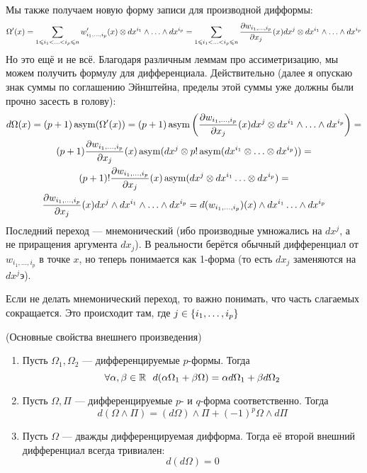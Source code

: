 \begin{note}
	Мы также получаем новую форму записи для производной дифформы:
	\[
		\Omega'(x) = \sum_{1 \leqslant i_1 < \ldots < i_p \leqslant n} w'_{i_1, \ldots, i_p}(x) \otimes dx^{i_1} \wedge \ldots \wedge dx^{i_p} = \sum_{1 \leqslant i_1 < \ldots < i_p \leqslant n} \frac{\partial w_{i_1, \ldots, i_p}}{\partial x_j}(x) dx^j \otimes dx^{i_1} \wedge \ldots \wedge dx^{i_p}
	\]
	Но это ещё и не всё. Благодаря различным леммам про ассиметризацию, мы можем получить формулу для дифференциала. Действительно (далее я опускаю знак суммы по соглашению Эйнштейна, пределы этой суммы уже должны были прочно засесть в голову):
	\begin{multline*}
		d\Omega(x) = (p + 1)\operatorname{asym}(\Omega'(x)) = (p + 1) \operatorname{asym}\left(\frac{\partial w_{i_1, \ldots, i_p}}{\partial x_j}(x)dx^j \otimes dx^{i_1} \wedge \ldots \wedge dx^{i_p}\right) =
		\\
		(p + 1) \frac{\partial w_{i_1, \ldots, i_p}}{\partial x_j}(x) \operatorname{asym}(dx^j \otimes p!\operatorname{asym}(dx^{i_1} \otimes \ldots \otimes dx^{i_p})) =
		\\
		(p + 1)! \frac{\partial w_{i_1, \ldots, i_p}}{\partial x_j}(x) \operatorname{asym}(dx^{j} \otimes dx^{i_1} \ldots \otimes dx^{i_p}) =
		\\
		\frac{\partial w_{i_1, \ldots, i_p}}{\partial x_j}(x) dx^j \wedge dx^{i_1} \wedge \ldots \wedge dx^{i_p} = d(w_{i_1, \ldots, i_p})(x) \wedge dx^{i_1} \ldots \wedge dx^{i_p}
	\end{multline*}
	Последний переход --- мнемонический (ибо производные умножались на $dx^j$, а не приращения аргумента $dx_j$). В реальности берётся обычный дифференциал от $w_{i_1, \ldots, i_p}$ в точке $x$, но теперь понимается как 1-форма (то есть $dx_j$ заменяются на $dx^jэ$).
\end{note}

\begin{note}
	Если не делать мнемонический переход, то важно понимать, что часть слагаемых сокращается. Это происходит там, где $j \in \{i_1, \ldots, i_p\}$
\end{note}

\begin{theorem} (Основные свойства внешнего произведения)
	\begin{enumerate}
		\item Пусть $\Omega_1, \Omega_2$ --- дифференцируемые $p$-формы. Тогда
		\[
			\forall \alpha, \beta \in \R\ \ d(\alpha\Omega_1 + \beta\Omega) = \alpha d\Omega_1 + \beta d\Omega_2
		\]
		
		\item Пусть $\Omega, \Pi$ --- дифференцируемые $p$- и $q$-форма соответственно. Тогда
		\[
			d(\Omega \wedge \Pi) = (d\Omega) \wedge \Pi + (-1)^p \Omega \wedge d\Pi
		\]
		
		\item Пусть $\Omega$ --- дважды дифференцируемая дифформа. Тогда её второй внешний дифференциал всегда тривиален:
		\[
			d(d\Omega) = 0
		\]
	\end{enumerate}
\end{theorem}

